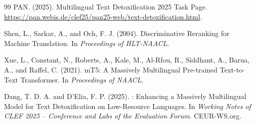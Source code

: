 \documentclass{article}
\begin{document}
\begin{thebibliography}{99}
PAN. (2025).
\newblock Multilingual Text Detoxification 2025 Task Page.
\newblock \url{https://pan.webis.de/clef25/pan25-web/text-detoxification.html}.

Shen, L., Sarkar, A., and Och, F. J. (2004).
\newblock Discriminative Reranking for Machine Translation.
\newblock In \emph{Proceedings of HLT-NAACL}.

Xue, L., Constant, N., Roberts, A., Kale, M., Al-Rfou, R., Siddhant, A., Barua, A., and Raffel, C. (2021).
\newblock mT5: A Massively Multilingual Pre-trained Text-to-Text Transformer.
\newblock In \emph{Proceedings of NAACL}.

Dang, T. D. A. and D'Elia, F. P. (2025).
: Enhancing a Massively Multilingual Model for Text Detoxification on Low-Resource Languages.
\newblock In \emph{Working Notes of CLEF 2025 -- Conference and Labs of the Evaluation Forum}. CEUR-WS.org.



\end{thebibliography}
\end{document}
